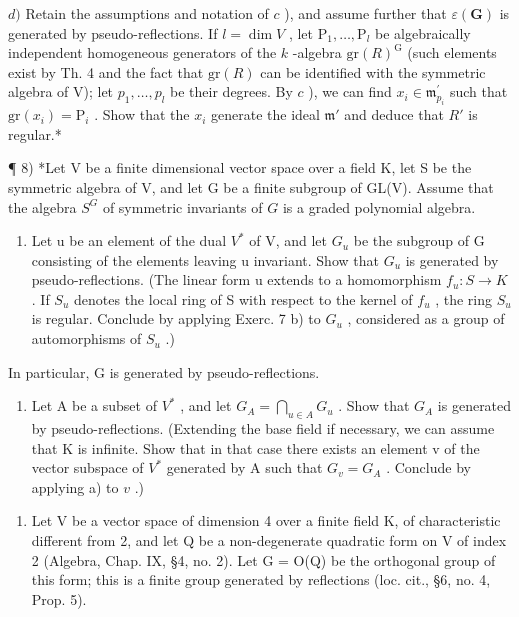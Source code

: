 \(d)\) Retain the assumptions and notation of \(c\) ), and assume further that \(\varepsilon (\mathbf{G})\) is generated by pseudo-reflections. If \(l = \dim V\) , let \(\mathrm{P}_1,\ldots ,\mathrm{P}_l\) be algebraically independent homogeneous generators of the \(k\) -algebra \(\mathrm{gr}(R)^{\mathrm{G}}\) (such elements exist by Th. 4 and the fact that \(\mathrm{gr}(R)\) can be identified with the symmetric algebra of V); let \(p_1,\ldots ,p_l\) be their degrees. By \(c\) ), we can find \(x_{i}\in \mathfrak{m}_{p_{i}}^{\prime}\) such that \(\mathrm{gr}(x_i) = \mathrm{P}_i\) . Show that the \(x_{i}\) generate the ideal \(\mathfrak{m}'\) and deduce that \(R'\) is regular.*

¶ 8) *Let V be a finite dimensional vector space over a field K, let S be the symmetric algebra of V, and let G be a finite subgroup of GL(V). Assume that the algebra \(S^G\) of symmetric invariants of \(G\) is a graded polynomial algebra.

\begin{enumerate}
\def\labelenumi{\alph{enumi})}
\tightlist
\item
  Let u be an element of the dual \(V^{*}\) of V, and let \(G_{u}\) be the subgroup of G consisting of the elements leaving u invariant. Show that \(G_{u}\) is generated by pseudo-reflections. (The linear form u extends to a homomorphism \(f_{u}: S \to K\) . If \(S_{u}\) denotes the local ring of S with respect to the kernel of \(f_{u}\) , the ring \(S_{u}\) is regular. Conclude by applying Exerc. 7 b) to \(G_{u}\) , considered as a group of automorphisms of \(S_{u}\) .)
\end{enumerate}

In particular, G is generated by pseudo-reflections.

\begin{enumerate}
\def\labelenumi{\alph{enumi})}
\setcounter{enumi}{1}
\tightlist
\item
  Let A be a subset of \(V^{*}\) , and let \(G_{A} = \bigcap_{u \in A} G_{u}\) . Show that \(G_{A}\) is generated by pseudo-reflections. (Extending the base field if necessary, we can assume that K is infinite. Show that in that case there exists an element v of the vector subspace of \(V^{*}\) generated by A such that \(G_{v} = G_{A}\) . Conclude by applying a) to \(v\) .)
\end{enumerate}

\begin{enumerate}
\def\labelenumi{\arabic{enumi})}
\setcounter{enumi}{8}
\tightlist
\item
  Let V be a vector space of dimension 4 over a finite field K, of characteristic different from 2, and let Q be a non-degenerate quadratic form on V of index 2 (Algebra, Chap. IX, §4, no. 2). Let G = O(Q) be the orthogonal group of this form; this is a finite group generated by reflections (loc. cit., §6, no. 4, Prop. 5).
\end{enumerate}


